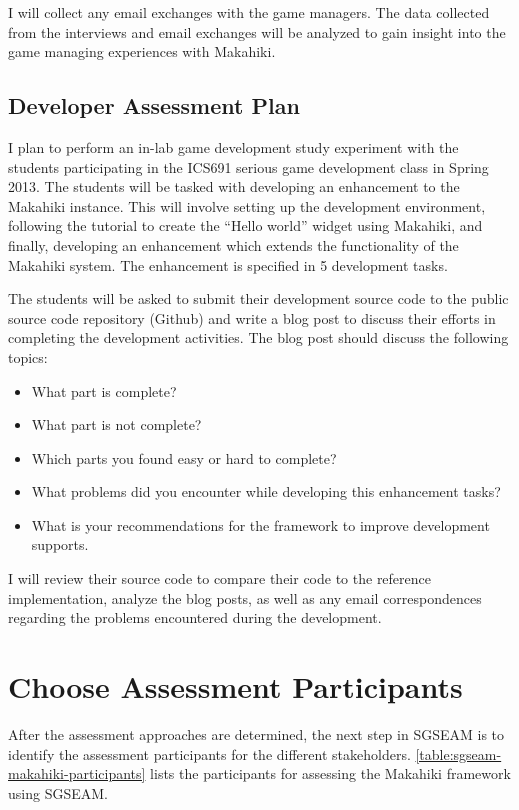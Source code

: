 I will collect any email exchanges with the game managers. The data collected from the interviews and email exchanges will be analyzed to gain insight into the game managing experiences with Makahiki. 

\subsection{Developer Assessment Plan}

I plan to perform an in-lab game development study experiment with the students participating in the ICS691 serious game development class in Spring 2013. The students will be tasked with developing an enhancement to the Makahiki instance. This will involve setting up the development environment, following the tutorial to create the ``Hello world'' widget using Makahiki, and finally, developing an enhancement which extends the functionality of the Makahiki system. The enhancement is specified in 5 development tasks. 

The students will be asked to submit their development source code to the public source code repository (Github) and write a blog post to discuss their efforts in completing the development activities. The blog post should discuss the following topics:
\begin{itemize}
\item What part is complete?
\item What part is not complete?
\item Which parts you found easy or hard to complete?
\item What problems did you encounter while developing this enhancement tasks?
\item What is your recommendations for the framework to improve development supports.
\end{itemize}

I will review their source code to compare their code to the reference implementation, analyze the blog posts, as well as any email correspondences regarding the problems encountered during the development. 

\section{Choose Assessment Participants}

After the assessment approaches are determined, the next step in SGSEAM is to identify the assessment participants for the different stakeholders. \autoref{table:sgseam-makahiki-participants} lists the participants for assessing the Makahiki framework using SGSEAM. 

